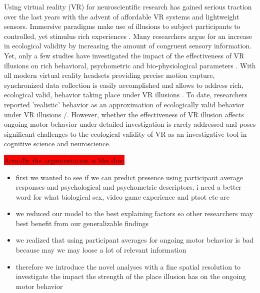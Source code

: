 Using virtual reality (VR) for neuroscientific research has gained serious traction over the last years with the advent of affordable VR systems and lightweight sensors. Immersive paradigms make use of illusions to subject participants to controlled, yet stimulus rich experiences \cite{Bohil2011}. Many researchers argue for an increase in ecological validity by increasing the amount of congruent sensory information. Yet, only a few studies have investigated the impact of the effectiveness of VR illusions on rich behavioral, psychometric and bio-physiological parameters \cite{Slater2009, Parsons2015, Kobayashi2015, Gonzalez-Franco2017}. With all modern virtual reality headsets providing precise motion capture, synchronized data collection is easily accomplished and allows to address rich, ecological valid, behavior taking place under VR illusions \cite{MakeigS.GramannK.JungT.P.SejnowskiT.J.Poizner2009, Gramann2014}. To date, researchers reported 'realistic' behavior as an approximation of ecologically valid behavior under VR illusions /. However, whether the effectiveness of VR illusion affects ongoing motor behavior under detailed investigation is rarely addressed and poses significant challenges to the ecological validity of VR as an investigative tool in cognitive science and neuroscience.

\colorbox{red}{Actually the argumentation is like this:}
\begin{itemize}
    \item first we wanted to see if we can predict presence using participant average responses and psychological and psychometric descriptors, i need a better word for what biological sex, video game experience and ptsot etc are
    \item we reduced our model to the best explaining factors so other researchers may best benefit from our generalizable findings
    \item we realized that using participant averages for ongoing motor behavior is bad because may we may loose a lot of relevant information
    \item therefore we introduce the novel analyses with a fine spatial resolution to investigate the impact the strength of the place illusion has on the ongoing motor behavior
\end{itemize}